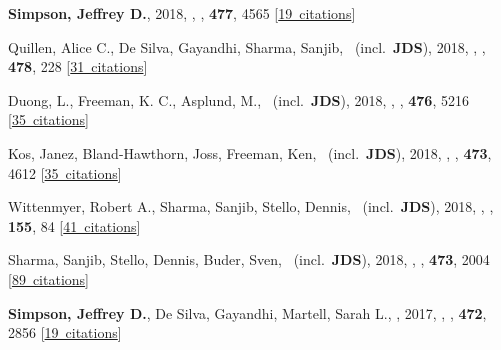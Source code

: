 \item[{\color{numcolor}\scriptsize18}] \textbf{Simpson, Jeffrey D.}, 2018, , \mnras, \textbf{477}, 4565 [\href{https://ui.adsabs.harvard.edu/#abs/2018MNRAS.477.4565S}{19~citations}]

\item[{\color{numcolor}\scriptsize17}] Quillen, Alice C., De Silva, Gayandhi, Sharma, Sanjib, \etal\ (incl.\ \textbf{JDS}), 2018, , \mnras, \textbf{478}, 228 [\href{https://ui.adsabs.harvard.edu/#abs/2018MNRAS.478..228Q}{31~citations}]

\item[{\color{numcolor}\scriptsize16}] Duong, L., Freeman, K. C., Asplund, M., \etal\ (incl.\ \textbf{JDS}), 2018, , \mnras, \textbf{476}, 5216 [\href{https://ui.adsabs.harvard.edu/#abs/2018MNRAS.476.5216D}{35~citations}]

\item[{\color{numcolor}\scriptsize15}] Kos, Janez, Bland-Hawthorn, Joss, Freeman, Ken, \etal\ (incl.\ \textbf{JDS}), 2018, , \mnras, \textbf{473}, 4612 [\href{https://ui.adsabs.harvard.edu/#abs/2018MNRAS.473.4612K}{35~citations}]

\item[{\color{numcolor}\scriptsize14}] Wittenmyer, Robert A., Sharma, Sanjib, Stello, Dennis, \etal\ (incl.\ \textbf{JDS}), 2018, , \aj, \textbf{155}, 84 [\href{https://ui.adsabs.harvard.edu/#abs/2018AJ....155...84W}{41~citations}]

\item[{\color{numcolor}\scriptsize13}] Sharma, Sanjib, Stello, Dennis, Buder, Sven, \etal\ (incl.\ \textbf{JDS}), 2018, , \mnras, \textbf{473}, 2004 [\href{https://ui.adsabs.harvard.edu/#abs/2018MNRAS.473.2004S}{89~citations}]

\item[{\color{numcolor}\scriptsize12}] \textbf{Simpson, Jeffrey D.}, De Silva, Gayandhi, Martell, Sarah L., \etal, 2017, , \mnras, \textbf{472}, 2856 [\href{https://ui.adsabs.harvard.edu/#abs/2017MNRAS.472.2856S}{19~citations}]


